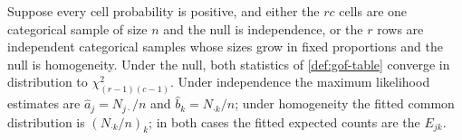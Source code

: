 \begin{corollary}
\label{cor:gof-table}
Suppose every cell probability is positive, and either the $rc$ cells are one categorical sample of size $n$ and the null is independence, or the $r$ rows are independent categorical samples whose sizes grow in fixed proportions and the null is homogeneity.
Under the null, both statistics of \cref{def:gof-table} converge in distribution to $\chi^2_{(r-1)(c-1)}$.
Under independence the maximum likelihood estimates are $\hat{a}_j = N_{j\cdot}/n$ and $\hat{b}_k = N_{\cdot k}/n$; under homogeneity the fitted common distribution is $(N_{\cdot k}/n)_k$; in both cases the fitted expected counts are the $E_{jk}$.
\end{corollary}

